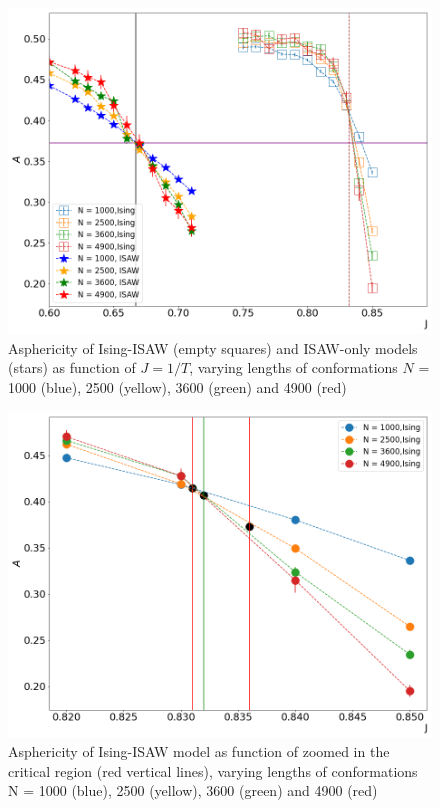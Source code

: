 \documentclass[aps,pre,amssymb,amsmath,twocolumn,floatfix]{revtex4-2}
\begin{document}
\begin{figure}[h!]
    \centering
    \includegraphics[width=\columnwidth]{Images/Ising_ISAW_A_J_Full.png}
    \caption{Asphericity of Ising-ISAW (empty squares) and ISAW-only models (stars) as function of $J=1/T$, varying lengths of conformations $N$ = 1000 (blue), 2500 (yellow), 3600 (green) and 4900 (red)}
    \label{fig:Ising&ISAW_A_J}
\end{figure}

\begin{figure}[h!]
    \centering
    \includegraphics[width=\columnwidth]{Images/Ising_A_J_Close.png}
    \caption{Asphericity of Ising-ISAW model as function of zoomed in the critical region (red vertical lines), varying lengths of conformations N = 1000 (blue), 2500 (yellow), 3600 (green) and 4900 (red)}
    \label{fig:Ising_A_J}
\end{figure}
\end{document}

